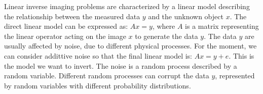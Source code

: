 \documentclass{article}
\begin{document}
Linear inverse imaging problems are characterized by a linear model describing the relationship between the measured data $y$ and the unknown object $x$.
The direct linear model can be expressed as: $Ax = y$, where $A$ is a matrix representing the linear operator acting on the image $x$ to generate the data $y$.
The data $y$ are usually affected by noise, due to different physical processes.
For the moment, we can consider addittive noise so that the final linear model is: $Ax = y+e$.
This is the model we want to invert.
The noise is a random process described by a random variable.
Different random processes can corrupt the data $y$, represented by random variables with different probability distributions.
\end{document}
